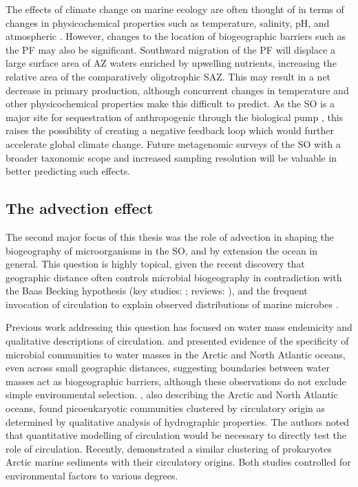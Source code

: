 The effects of climate change on marine ecology are often thought of in terms of changes in physicochemical properties such as temperature, salinity, pH, and atmospheric .
However, changes to the location of biogeographic barriers such as the \ac{PF} may also be significant.
Southward migration of the \ac{PF} will displace a large surface area of \ac{AZ} waters enriched by upwelling nutrients, increasing the relative area of the comparatively oligotrophic \ac{SAZ}.
This may result in a net decrease in primary production, although concurrent changes in temperature and other physicochemical properties make this difficult to predict.
As the \ac{SO} is a major site for sequestration of anthropogenic  through the biological pump \cite{Thomalla:2011hi}, this raises the possibility of creating a negative feedback loop \cite{Cox:2000ko} which would further accelerate global climate change.
Future metagenomic surveys of the \ac{SO} with a broader taxonomic scope and increased sampling resolution will be valuable in better predicting such effects.

\subsection{The advection effect}

The second major focus of this thesis was the role of advection in shaping the biogeography of microorganisms in the \ac{SO}, and by extension the ocean in general.
This question is highly topical, given the recent discovery that geographic distance often controls microbial biogeography in contradiction with the Baas Becking hypothesis (key studies: \citet{Cho:2000tn,Whitaker:2003dz}; reviews: \citet{Martiny:2006jy,Hanson:2012cb}), and the frequent invocation of circulation to explain observed distributions of marine microbes \citep[e.g.][]{Lauro:2007bf,Giebel:2009hr,Ghiglione:2012ei,Sul:2013in}.

Previous work addressing this question has focused on water mass endemicity and qualitative descriptions of circulation.
\citet{Galand:2009hy} and \citet{Agogue:2011fm} presented evidence of the specificity of microbial communities to water masses in the Arctic and North Atlantic oceans, even across small geographic distances, suggesting boundaries between water masses act as biogeographic barriers, although these observations do not exclude simple environmental selection.
\citet{Hamilton:2008tp}, also describing the Arctic and North Atlantic oceans, found picoeukaryotic communities clustered by circulatory origin as determined by qualitative analysis of hydrographic properties.
The authors noted that quantitative modelling of circulation would be necessary to directly test the role of circulation.
Recently, \citet{Hamdan:2013ko} demonstrated a similar clustering of prokaryotes Arctic marine sediments with their circulatory origins.
Both studies controlled for environmental factors to various degrees.

